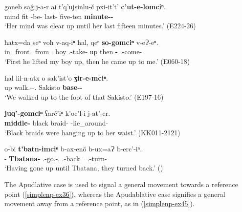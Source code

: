 \begin{exe}
	\ex\label{simplenp-ex47}
	\begin{xlist}
		
			\ex\label{simplenp-ex47a}
			\gll goneb sa\u{g} j-a-r ai t'q'ujsinlu-č pxi-it't' \textbf{c'ut-e-lomciⁿ}. \\
			mind fit {\J}-be-{\Imprf} {\Deict} last-{\Obl} five-ten \textbf{minute-{\Obl}-{\Interterm}} \\
			\trans `Her mind was clear up until her last fifteen minutes.'
			\hfill (E224-26)
		
		
		
			\ex\label{simplenp-ex47b}
			\gll ħatx=da seⁿ voħ v-aq-iⁿ ħal, qeⁿ \textbf{so-gomciⁿ} v-eɁ-eⁿ.\\
			in\_front=from {\Fsg}.{\Gen} boy {\M}.{\Sg}-take-{\Aor} up then \textbf{{\Fsg}-{\Adterm}} {\M}.{\Sg}-come-{\Aor}\\
			\trans `First he lifted my boy up, then he came up to me.'
			\hfill (E060-18)
		
		
		
			\ex\label{simplenp-ex47c}
			\gll ħal lil-n-atx o sak'ist'o \textbf{ʒir-e-mciⁿ}. \\
			up walk.{\Ipfv}-{\Aor}-{\Fpl}.{\Erg} {\Dist} Sakisto \textbf{base-{\Obl}-{\Term}} \\
			\trans `We walked up to the foot of that Sakisto.'
			\hfill (E197-16)
		
		
		
			\ex\label{simplenp-ex47d}
			\gll \textbf{juq'-gomciⁿ} ʕarč'iⁿ k'oc'l-i j-at'-er. \\
			\textbf{middle-{\Adterm}} black braid-{\Pl} {\J}-lie\_around-{\Imprf} \\
			\trans `Black braids were hanging up to her waist.'
			\hfill (KK011-2121)
		
		
		
			\ex\label{simplenp-ex47e}
			\gll o-bi \textbf{t'batn-imciⁿ} b-ax-en\u{o} b-ux=aɁ b-erc'-iⁿ. \\
			{\Dist}-{\Pl} \textbf{Tbatana-{\Interm}} {\M}.{\Pl}-go.{\Pfv}-{\Ptcp}.{\Aor} {\M}.{\Pl}-back={\Emph} {\M}.{\Pl}-turn-{\Aor} \\
			\trans `Having gone up until Tbatana, they turned back.'
			\hfill (\cite[72]{desheriev53})
		
		
	\end{xlist}
\end{exe}



The Apudlative case is used to signal a general movement towards a reference point (\ref{simplenp-ex36}), whereas the Apudablative case signifies a general movement away from a reference point, as in (\ref{simplenp-ex45}).

